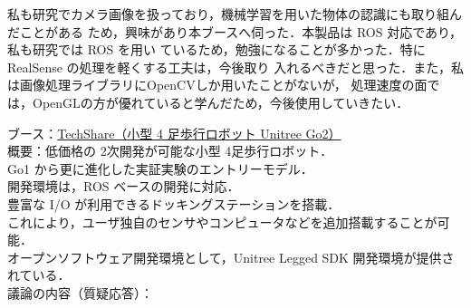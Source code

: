 \documentclass{jsarticle}
\begin{document}
\hspace*{5.7zw}私も研究でカメラ画像を扱っており，機械学習を用いた物体の認識にも取り組んだことがある
\hspace*{6.7zw}ため，興味があり本ブースへ伺った．本製品は ROS 対応であり，私も研究では ROS を用い
\hspace*{6.7zw}ているため，勉強になることが多かった．特に RealSense の処理を軽くする工夫は，今後取り
\hspace*{6.7zw}入れるべきだと思った．また，私は画像処理ライブラリにOpenCVしか用いたことがないが，
\hspace*{6.7zw}処理速度の面では，OpenGLの方が優れていると学んだため，今後使用していきたい．


\newpage

\vspace*{-10zh}

\hspace*{4.7zw}ブース：\underline{TechShare（小型 4 足歩行ロボット Unitree Go2）}\\

\hspace*{4.7zw}概要：低価格の 2次開発が可能な小型 4足歩行ロボット．\\
\hspace*{8.7zw}Go1 から更に進化した実証実験のエントリーモデル．\\
\hspace*{8.7zw}開発環境は，ROS ベースの開発に対応．\\
\hspace*{8.7zw}豊富な I/O が利用できるドッキングステーションを搭載．\\
\hspace*{8.7zw}これにより，ユーザ独自のセンサやコンピュータなどを追加搭載することが可能．\\
\hspace*{8.7zw}オープンソフトウェア開発環境として，Unitree Legged SDK 開発環境が提供されている．\\


\hspace*{4.7zw}議論の内容（質疑応答）：
\end{document}
